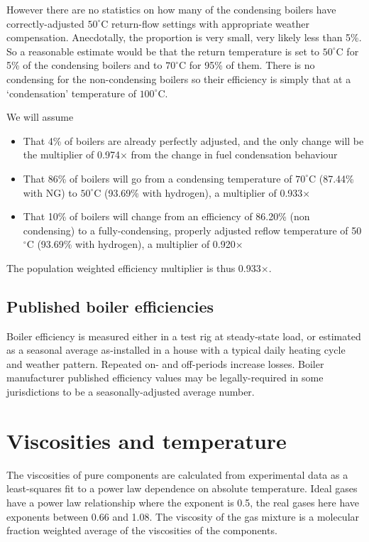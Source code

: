 \documentclass[5p]{elsarticle} %
\begin{document}
However there are no statistics on how many of the condensing boilers have correctly-adjusted $50^\circ$C return-flow settings with appropriate weather compensation. Anecdotally, the proportion is very small, very likely less than 5\%. So a reasonable estimate would be that the return temperature is set to $50^\circ$C for 5\% of the condensing boilers and to $70^\circ$C for 95\% of them. There is no condensing for the non-condensing boilers so their efficiency is simply that at  a `condensation' temperature of $100^\circ$C.

We will assume
\begin{itemize}
    \item That 4\% of boilers are already perfectly adjusted, and the only change will be the multiplier of 0.974$\times$ from the change in fuel condensation behaviour
    \item That 86\% of boilers will go from a condensing temperature of $70^\circ$C (87.44\% with NG) to $50^\circ$C (93.69\% with hydrogen), a multiplier of  0.933$\times$
    \item That 10\% of boilers will change from an efficiency of  86.20\% (non condensing) to a fully-condensing, properly adjusted reflow temperature of 50$^\circ$C (93.69\% with hydrogen), a multiplier of 0.920$\times$
\end{itemize}
The population weighted efficiency multiplier is thus 0.933$\times$.

\subsection{Published boiler efficiencies}
Boiler efficiency\citep{Bennet2017} is measured either in a test rig at steady-state load, or estimated as a seasonal average as-installed in a house with a typical daily heating cycle and weather pattern. Repeated on- and off-periods increase losses\citep{saty2018}. 
Boiler manufacturer published efficiency values may be legally-required in some jurisdictions to be a seasonally-adjusted average number.

\section{Viscosities and temperature}
\label{sec:viscosities}

The viscosities of pure components are calculated from experimental data as a least-squares fit to a power law dependence on absolute temperature. 
Ideal gases have a power law relationship where the exponent is 0.5, the real gases here have exponents between 0.66 and 1.08. The viscosity of the gas mixture is a molecular fraction weighted average\citep{Krieger1951} of the viscosities of the components.
\end{document}
